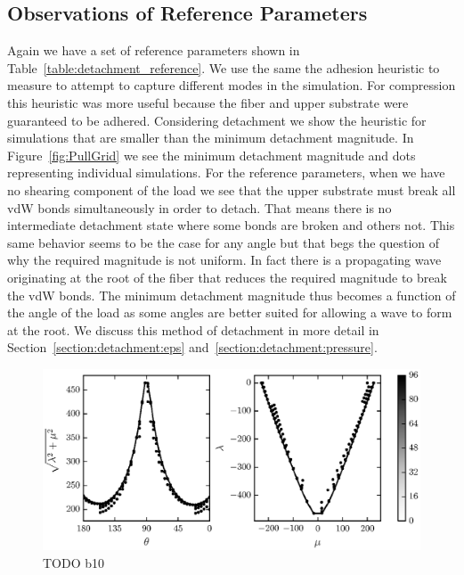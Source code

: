 \subsection{Observations of Reference Parameters}

Again we have a set of reference parameters shown in Table~\ref{table:detachment_reference}. We use the same the adhesion heuristic to measure to attempt to capture different modes in the simulation. For compression this heuristic was more useful because the fiber and upper substrate were guaranteed to be adhered. Considering detachment we show the heuristic for simulations that are smaller than the minimum detachment magnitude. In Figure~\ref{fig:PullGrid} we see the minimum detachment magnitude and dots representing individual simulations. For the reference parameters, when we have no shearing component of the load we see that the upper substrate must break all vdW bonds simultaneously in order to detach. That means there is no intermediate detachment state where some bonds are broken and others not. This same behavior seems to be the case for any angle but that begs the question of why the required magnitude is not uniform. In fact there is a propagating wave originating at the root of the fiber that reduces the required magnitude to break the vdW bonds. The minimum detachment magnitude thus becomes a function of the angle of the load as some angles are better suited for allowing a wave to form at the root. We discuss this method of detachment in more detail in Section~\ref{section:detachment:eps} and~\ref{section:detachment:pressure}.

	\begin{figure}[t]
		\begin{center}
			\includegraphics{./fig/ch3/pull/b10/grid.eps}
		\end{center}		
		\caption{ TODO b10
		\label{fig:PullGrid:b10}}
	\end{figure}
	
